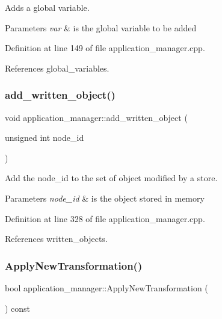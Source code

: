 Adds a global variable. 


\begin{DoxyParams}{Parameters}
{\em var} & is the global variable to be added \\
\hline
\end{DoxyParams}


Definition at line 149 of file application\+\_\+manager.\+cpp.



References global\+\_\+variables.

\mbox{\label{classapplication__manager_a917d132d540b5fb71a236dbb8f1c6a31}} 
\subsubsection{\texorpdfstring{add\+\_\+written\+\_\+object()}{add\_written\_object()}}
{\footnotesize\ttfamily void application\+\_\+manager\+::add\+\_\+written\+\_\+object (\begin{DoxyParamCaption}\item[{unsigned int}]{node\+\_\+id }\end{DoxyParamCaption})}



Add the node\+\_\+id to the set of object modified by a store. 


\begin{DoxyParams}{Parameters}
{\em node\+\_\+id} & is the object stored in memory \\
\hline
\end{DoxyParams}


Definition at line 328 of file application\+\_\+manager.\+cpp.



References written\+\_\+objects.

\mbox{\label{classapplication__manager_a915cefdfbd50a26581c5ac028884cf6b}} 
\subsubsection{\texorpdfstring{Apply\+New\+Transformation()}{ApplyNewTransformation()}}
{\footnotesize\ttfamily bool application\+\_\+manager\+::\+Apply\+New\+Transformation (\begin{DoxyParamCaption}{ }\end{DoxyParamCaption}) const}



